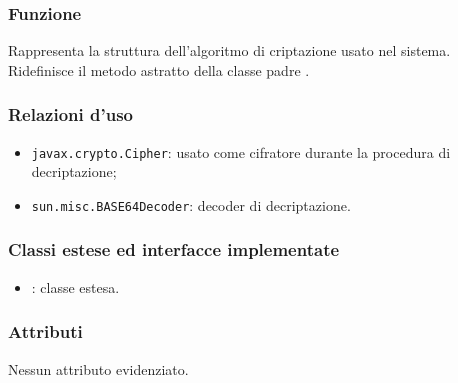 
\subsubsection*{Funzione}
Rappresenta la struttura dell'algoritmo di criptazione usato nel sistema. Ridefinisce il metodo astratto  della classe padre .

\subsubsection*{Relazioni d'uso}
\begin{itemize}
	\item \texttt{javax.crypto.Cipher}: usato come cifratore durante la procedura di decriptazione;
	\item \texttt{sun.misc.BASE64Decoder}: decoder di decriptazione.
\end{itemize}

\subsubsection*{Classi estese ed interfacce implementate}

\begin{itemize}
	\item {}: classe estesa.
\end{itemize}

\subsubsection*{Attributi}

Nessun attributo evidenziato.


